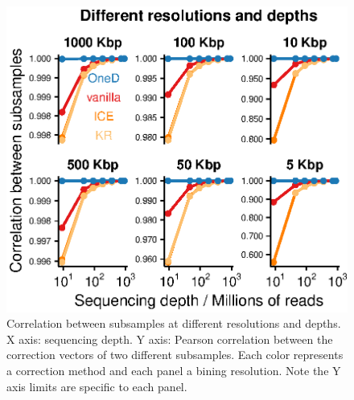 \documentclass[12pt]{report}
\begin{document}
\begin{figure}
	\centerline{\includegraphics[width=\textwidth]{nar_figures/supp_figure_14.eps}}
    \caption{Correlation between subsamples at different resolutions and
    depths. X axis: sequencing depth. Y axis: Pearson correlation between the
    correction vectors of two different subsamples. Each color represents a
    correction method and each panel a bining resolution. Note the Y axis limits
    are specific to each panel.}
\end{figure}
\end{document}
